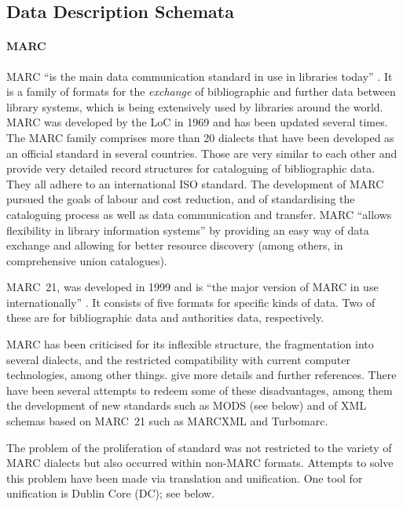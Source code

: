 \subsection{Data Description Schemata}
\label{subsec:data_descr_schemata}

\paragraph{MARC}

\gls{MARC} \enquote{is the main data communication standard in use in libraries today}
\autocite[p.198]{Hider2008}. It is a family of formats for the \emph{exchange} of bibliographic
and further data between library systems, which is being extensively used by libraries around the world. 
MARC was developed by the \gls{LoC} in 1969
and has been updated several times.
The MARC family comprises more than 20 dialects that have been developed as an official standard
in several countries.
Those are very similar to each other and provide very detailed record structures for cataloguing of bibliographic data.
They all adhere to an international \gls{ISO} standard.
The development of MARC pursued the goals of labour and cost reduction,
and of standardising the cataloguing process
as well as data communication and transfer.
MARC \enquote{allows flexibility in library information systems} \autocite[p.201]{Hider2008}
by providing an easy way of data exchange and allowing for better resource discovery (among others, in comprehensive union catalogues).

MARC~21, was developed in 1999 and is \enquote{the major version of MARC in use internationally} \autocite[p.205]{Hider2008}.
It consists of five formats for specific kinds of data.
Two of these are for bibliographic data and authorities data, respectively.

MARC has been criticised for its inflexible structure, the fragmentation into several dialects,
and the restricted compatibility with current computer technologies, among other things.
\textcite[p.212]{Hider2008} give more details and further references.
There have been several attempts to redeem some of these disadvantages,
among them the development of new standards such as MODS (see below)
and of \gls{XML} schemas based on MARC~21 such as MARCXML and Turbomarc.

The problem of the proliferation of standard was not restricted to the
variety of MARC dialects but also occurred within non-MARC formats.
Attempts to solve this problem have been made via
translation and unification. One tool for unification is Dublin Core (DC); see below.


